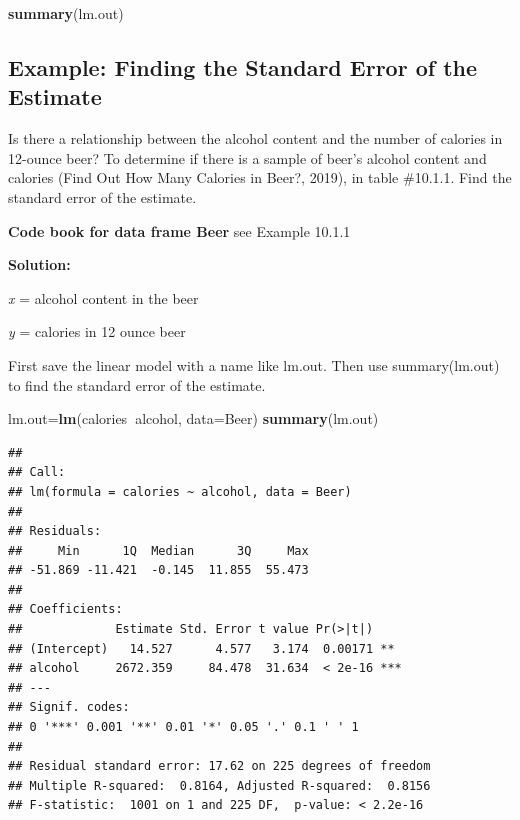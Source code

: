 \documentclass[
]{book}
\newenvironment{Shaded}{\begin{snugshade}}{\end{snugshade}}
\newcommand{\DataTypeTok}[1]{\textcolor[rgb]{0.13,0.29,0.53}{#1}}
\newcommand{\KeywordTok}[1]{\textcolor[rgb]{0.13,0.29,0.53}{\textbf{#1}}}
\newcommand{\NormalTok}[1]{#1}
\newcommand{\OperatorTok}[1]{\textcolor[rgb]{0.81,0.36,0.00}{\textbf{#1}}}
\begin{document}
\begin{Shaded}
\begin{Highlighting}[]
\KeywordTok{summary}\NormalTok{(lm.out)}
\end{Highlighting}
\end{Shaded}

\hypertarget{example-finding-the-standard-error-of-the-estimate}{%
\subsection{Example: Finding the Standard Error of the Estimate}\label{example-finding-the-standard-error-of-the-estimate}}

Is there a relationship between the alcohol content and the number of calories in 12-ounce beer? To determine if there is a sample of beer's alcohol content and calories (Find Out How Many Calories in Beer?, 2019), in table \#10.1.1. Find the standard error of the estimate.

\textbf{Code book for data frame Beer} see Example 10.1.1

\textbf{Solution:}

\emph{x} = alcohol content in the beer

\emph{y} = calories in 12 ounce beer

First save the linear model with a name like lm.out. Then use summary(lm.out) to find the standard error of the estimate.

\begin{Shaded}
\begin{Highlighting}[]
\NormalTok{lm.out=}\KeywordTok{lm}\NormalTok{(calories}\OperatorTok{~}\NormalTok{alcohol, }\DataTypeTok{data=}\NormalTok{Beer)}
\KeywordTok{summary}\NormalTok{(lm.out)}
\end{Highlighting}
\end{Shaded}

\begin{verbatim}
## 
## Call:
## lm(formula = calories ~ alcohol, data = Beer)
## 
## Residuals:
##     Min      1Q  Median      3Q     Max 
## -51.869 -11.421  -0.145  11.855  55.473 
## 
## Coefficients:
##             Estimate Std. Error t value Pr(>|t|)    
## (Intercept)   14.527      4.577   3.174  0.00171 ** 
## alcohol     2672.359     84.478  31.634  < 2e-16 ***
## ---
## Signif. codes:  
## 0 '***' 0.001 '**' 0.01 '*' 0.05 '.' 0.1 ' ' 1
## 
## Residual standard error: 17.62 on 225 degrees of freedom
## Multiple R-squared:  0.8164, Adjusted R-squared:  0.8156 
## F-statistic:  1001 on 1 and 225 DF,  p-value: < 2.2e-16
\end{verbatim}
\end{document}

